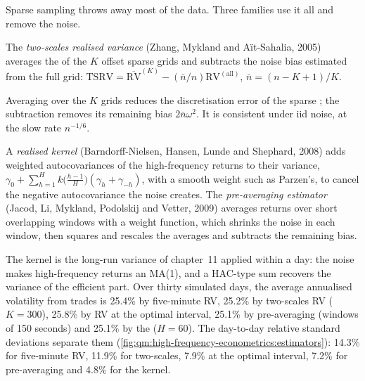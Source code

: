 Sparse sampling throws away most of the data. Three families use it all and remove the noise.

\begin{definition}\label{def:qm:high-frequency-econometrics:tsrv}
The \emph{two-scales realised variance} (Zhang, Mykland and Aït-Sahalia, 2005) averages the  of the $K$ offset sparse grids
and subtracts the noise bias estimated from the full grid: $\mathrm{TSRV} = \overline{\mathrm{RV}}^{(K)} - (\bar n/n)\mathrm{RV}^{(\mathrm{all})}$, $\bar n = (n - K + 1)/K$.
\end{definition}

Averaging over the $K$ grids reduces the discretisation error of the sparse ; the subtraction removes its remaining bias $2\bar n\omega^2$. It is consistent under
iid noise, at the slow rate $n^{-1/6}$.

\begin{definition}\label{def:qm:high-frequency-econometrics:kernel}
A \emph{realised kernel} (Barndorff-Nielsen, Hansen, Lunde and Shephard, 2008) adds weighted autocovariances of the high-frequency returns to their
variance, $\gamma_0 + \sum_{h=1}^Hk\bigl(\frac{h-1}H\bigr)(\gamma_h + \gamma_{-h})$, with a smooth weight such as Parzen's, to cancel the negative autocovariance the noise creates.
The \emph{pre-averaging estimator} (Jacod, Li, Mykland, Podolskij and Vetter, 2009) averages returns over short overlapping windows with a
weight function, which shrinks the noise in each window, then squares and rescales the averages and subtracts the remaining bias.
\end{definition}

The kernel is the long-run variance of chapter~11 applied within a day: the noise makes high-frequency returns an MA(1), and a HAC-type sum recovers the variance of the
efficient part. Over thirty simulated days, the average annualised volatility from trades is 25.4\% by five-minute RV, 25.2\% by two-scales RV ($K = 300$), 25.8\% by RV at the
optimal interval, 25.1\% by pre-averaging (windows of 150 seconds) and 25.1\% by the  ($H = 60$). The day-to-day relative standard deviations separate them
(\cref{fig:qm:high-frequency-econometrics:estimators}): 14.3\% for five-minute RV, 11.9\% for two-scales, 7.9\% at the optimal interval, 7.2\% for pre-averaging and 4.8\% for the
kernel.

